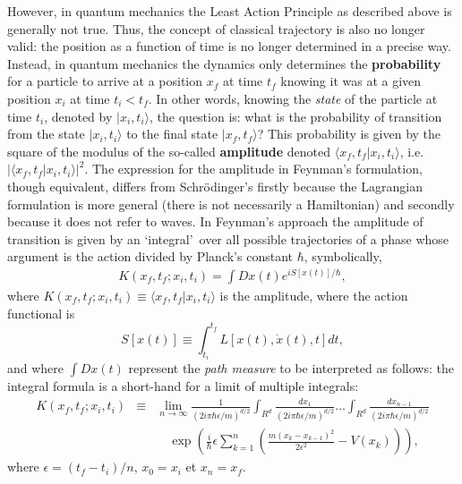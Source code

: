 \documentclass[12pt]{article}   %
\begin{document}
However, in quantum mechanics the Least Action Principle as
described above is generally not true. Thus, the concept of
classical trajectory is also no longer valid: the position as a
function of time is no longer determined in a precise way.
Instead, in quantum mechanics the dynamics only determines the
\textbf{probability} for a particle to arrive at a position $x_f$
at time $t_f$ knowing it was at a given position $x_i$ at time
$t_i<t_f$. In other words, knowing the \textit{state} of the
particle at time $t_i$, denoted by $|x_i,t_i\rangle$, the question
is: what is the probability of transition from the state
$|x_i,t_i\rangle $ to the final state $|x_f,t_f \rangle$? This
probability is given by the square of the modulus of the so-called
\textbf{amplitude} denoted $ \langle x_f,t_f|x_i,t_i \rangle$,
i.e. $|\langle x_f,t_f|x_i,t_i \rangle|^2$. The expression for the
amplitude in Feynman's formulation, though equivalent, differs
from Schr\"odinger's firstly because the Lagrangian formulation is
more general (there is not necessarily a Hamiltonian) and secondly
because it does not refer to waves. In Feynman's approach the
amplitude of transition is given by an \lq integral\rq\ over all
possible trajectories of a phase whose argument is the action
divided by Planck's constant $\hbar$, symbolically,
\begin{eqnarray*}
K(x_f,t_f;x_i,t_i) = \int Dx(t) e^{i S[x(t)]/\hbar},
\end{eqnarray*}
where $K(x_f,t_f;x_i,t_i) \equiv \langle x_f,t_f|x_i,t_i
\rangle$ is the amplitude, where the action functional is
$$ S[x(t)]\equiv\int_{t_i}^{t_f} L[x(t),\dot{x}(t),t]dt, $$ and where
$\int Dx(t)$ represent the \textit{path measure} to be interpreted
as follows: the integral formula is a short-hand for a limit of
multiple integrals:
\begin{eqnarray}\label{Klim}
K(x_f,t_f;x_i,t_i) &\equiv& \lim_{n\rightarrow\infty}
\frac{1}{(2i\pi \hbar\epsilon/m)^{d/2}}
\int_{R^d}\frac{dx_1}{(2i\pi \hbar\epsilon/m)^{d/2}}
\ldots\int_{R^d}\frac{dx_{n-1}}{(2i\pi \hbar\epsilon/m)^{d/2}}
{}\nonumber{}\\&& \quad \exp{\left(\frac{i}{\hbar}\epsilon
\sum_{k=1}^{n}(\frac{m(x_{k}-x_{k-1})^2}{2\epsilon^2}-V(x_k))
\right)},
\end{eqnarray}
where $\epsilon=(t_f-t_i)/n$, $x_0 = x_i$ et $x_n = x_f$.
\end{document}
